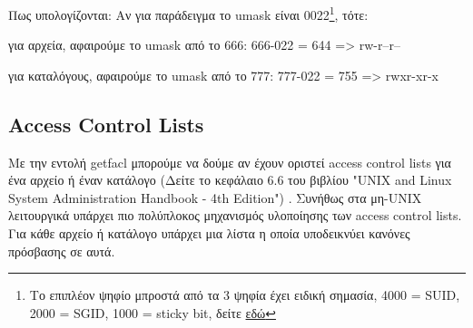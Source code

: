 Πως υπολογίζονται: Αν για παράδειγμα το umask είναι 0022\footnote{Το επιπλέον ψηφίο μπροστά από τα 3 ψηφία έχει ειδική σημασία, 4000 = SUID, 2000 = SGID, 1000 = sticky bit, δείτε \href{http://docs.oracle.com/cd/E19683-01/806-4078/secfiles-69/index.html}{εδώ}}, τότε:
\begin{packed_item}
	\item για αρχεία, αφαιρούμε το umask από το 666: 666-022 = 644 => rw-r--r--
	\item για καταλόγους, αφαιρούμε το umask από το 777: 777-022 = 755 => rwxr-xr-x
\end{packed_item}

\subsection*{Access Control Lists}

Με την εντολή getfacl μπορούμε να δούμε αν έχουν οριστεί access control lists για ένα αρχείο ή έναν κατάλογο (Δείτε το κεφάλαιο 6.6 του βιβλίου "UNIX and Linux System Administration Handbook - 4th Edition") \cite{nemeth2011unix}. Συνήθως στα μη-UNIX λειτουργικά υπάρχει πιο πολύπλοκος μηχανισμός υλοποίησης των access control lists. Για κάθε αρχείο ή κατάλογο υπάρχει μια λίστα η οποία υποδεικνύει κανόνες πρόσβασης σε αυτά.   
